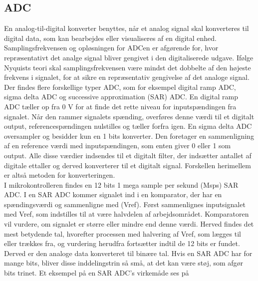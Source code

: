 \subsection{ADC}
En analog-til-digital konverter benyttes, når et analog signal skal konverteres til digital data, som kan bearbejdes eller visualiseres af en digital enhed. Samplingsfrekvensen og opløsningen for ADCen er afgørende for, hvor repræsentativt det analge signal bliver gengivet i den digitaliserede udgave. Ifølge Nyquists teori skal samplingsfrekvensen være mindst det dobbelte af den højeste frekvens i signalet, for at sikre en repræsentativ gengivelse af det analoge signal. Der findes flere forskellige typer ADC, som for eksempel digital ramp ADC, sigma delta ADC og successive approximation (SAR) ADC. En digital ramp ADC tæller op fra 0 V for at finde det rette niveau for inputspændingen fra signalet. Når den rammer signalets spænding, overføres denne værdi til et digitalt output, referencespændingen nulstilles og tæller forfra igen. En sigma delta ADC oversampler og besidder kun en 1 bits konverter. Den foretager en sammenligning af en reference værdi med inputspændingen, som enten giver 0 eller 1 som output. Alle disse værdier indsendes til et digitalt filter, der indsætter antallet af digitale ettaller og derved konverterer til et digitalt signal. Forskellen herimellem er altså metoden for konverteringen. \citep{Moore2004,Sheingold2014} \\
I mikrokontrolleren findes en 12 bits 1 mega sample per sekund (Msps) SAR ADC. I en SAR ADC kommer signalet ind i en komparator, der har en spændingsværdi og sammenligne med (Vref). Først sammenlignes inputsignalet med Vref, som indstilles til at være halvdelen af arbejdsområdet. Komparatoren vil vurdere, om signalet er større eller mindre end denne værdi. Herved findes det mest betydende tal, hvorefter processen med halvering af Vref, som lægges til eller trækkes fra, og vurdering herudfra fortsætter indtil de 12 bits er fundet. Derved er den analoge data konverteret til binære tal. Hvis en SAR ADC har for mange bits, bliver disse inddelingstrin så små, at det kan være støj, som afgør bits trinet. \citep{Moore2004,Sheingold2014} Et eksempel på en SAR ADC's virkemåde ses på 
